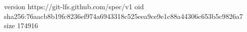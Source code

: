 version https://git-lfs.github.com/spec/v1
oid sha256:76aacb8b19fc8236ef974a6943318c525eea9ce9e1c88a44306c653b5c9826a7
size 174916
